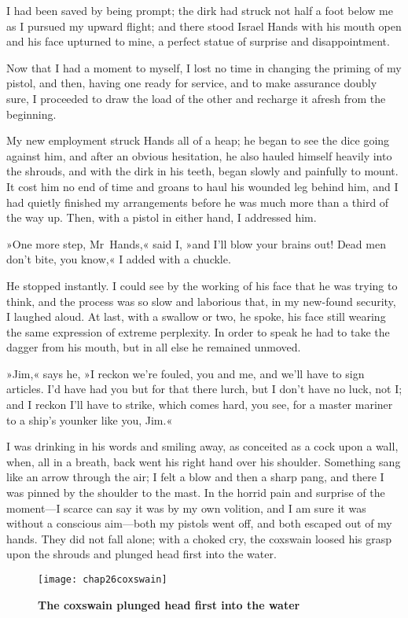 I had been saved by being prompt; the dirk had struck not half a foot below me as I pursued my upward flight; and there stood Israel Hands with his mouth open and his face upturned to mine, a perfect statue of surprise and disappointment.

Now that I had a moment to myself, I lost no time in changing the priming of my pistol, and then, having one ready for service, and to make assurance doubly sure, I proceeded to draw the load of the other and recharge it afresh from the beginning.

My new employment struck Hands all of a heap; he began to see the dice going against him, and after an obvious hesitation, he also hauled himself heavily into the shrouds, and with the dirk in his teeth, began slowly and painfully to mount. It cost him no end of time and groans to haul his wounded leg behind him, and I had quietly finished my arrangements before he was much more than a third of the way up. Then, with a pistol in either hand, I addressed him.

»One more step, Mr~Hands,« said I, »and I'll blow your brains out! Dead men don't bite, you know,« I added with a chuckle.

He stopped instantly. I could see by the working of his face that he was trying to think, and the process was so slow and laborious that, in my new-found security, I laughed aloud. At last, with a swallow or two, he spoke, his face still wearing the same expression of extreme perplexity. In order to speak he had to take the dagger from his mouth, but in all else he remained unmoved.

»Jim,« says he, »I reckon we're fouled, you and me, and we'll have to sign articles. I'd have had you but for that there lurch, but I don't have no luck, not I; and I reckon I'll have to strike, which comes hard, you see, for a master mariner to a ship's younker like you, Jim.«

I was drinking in his words and smiling away, as conceited as a cock upon a wall, when, all in a breath, back went his right hand over his shoulder. Something sang like an arrow through the air; I felt a blow and then a sharp pang, and there I was pinned by the shoulder to the mast. In the horrid pain and surprise of the moment—I scarce can say it was by my own volition, and I am sure it was without a conscious aim—both my pistols went off, and both escaped out of my hands. They did not fall alone; with a choked cry, the coxswain loosed his grasp upon the shrouds and plunged head first into the water.

    \begin{figure}[p]
\centering
\texttt{[image: chap26coxswain]}
\caption{\textbf{The coxswain plunged head first into the water}}
\end{figure}   